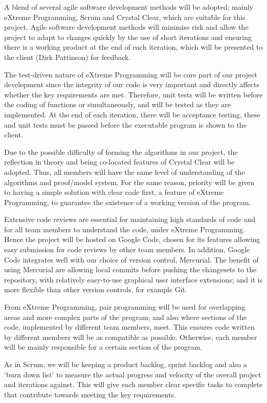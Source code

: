 A blend of several agile software development methods will be adopted; mainly eXtreme Programming, Scrum and Crystal Clear, which are suitable for this project. Agile software development methods will minimise risk and allow the project to adapt to changes quickly by the use of short iterations and ensuring there is a working product at the end of each iteration, which will be presented to the client (Dirk Pattinson) for feedback.

The test-driven nature of eXtreme Programming will be core part of our project development since the integrity of our code is very important and directly affects whether the key requirements are met. Therefore, unit tests will be written before the coding of functions or simultaneously, and will be tested as they are implemented. At the end of each iteration, there will be acceptance testing, these and unit tests must be passed before the executable program is shown to the client.

Due to the possible difficulty of forming the algorithms in our project, the reflection in theory and being co-located features of Crystal Clear will be adopted. Thus, all members will have the same level of understanding of the algorithms and proof/model system. For the same reason, priority will be given to having a simple solution with clear code first, a feature of eXtreme Programming, to guarantee the existence of a working version of the program.

Extensive code reviews are essential for maintaining high standards of code and for all team members to understand the code, under eXtreme Programming. Hence the project will be hosted on Google Code, chosen for its features allowing easy submission for code reviews by other team members. In addition, Google Code integrates well with our choice of version control, Mercurial. The benefit of using Mercurial are allowing local commits before pushing the changesets to the repository, with relatively easy-to-use graphical user interface extensions; and it is more flexible than other version controls, for example Git.

From eXtreme Programming, pair programming will be used for overlapping areas and more complex parts of the program; and also where sections of the code, implemented by different team members, meet. This ensures code written by different members will be as compatible as possible. Otherwise, each member will be mainly responsible for a certain section of the program.

As in Scrum, we will be keeping a product backlog, sprint backlog and also a `burn down list' to measure the actual progress and velocity of the overall project and iterations against. This will give each member clear specific tasks to complete that contribute towards meeting the key requirements.

